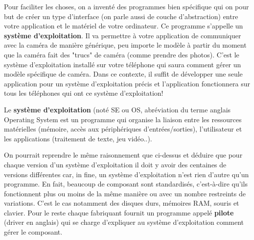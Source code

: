 Pour faciliter les choses, on a inventé des programmes bien spécifique qui on pour but de créer un type d'interface (on parle aussi de couche d'abstraction) entre votre application et le matériel de votre ordinateur. Ce programme s'appelle un {\bf système d’exploitation}. Il va permettre à votre application de communiquer avec la caméra de manière générique, peu importe le modèle à partir du moment que la caméra fait des "trucs" de caméra (comme prendre des photos). C'est le système d'exploitation installé sur votre téléphone qui saura comment gérer un modèle spécifique de caméra. Dans ce contexte, il suffit de développer une seule application pour un système d'exploitation précis et l'application fonctionnera sur tous les téléphones qui ont ce système d'exploitation!
\begin{mydefinition}
	Le {\bf système d’exploitation} (noté SE ou OS, abréviation du terme anglais Operating System est un programme qui organise la liaison entre les ressources matérielles (mémoire, accès aux périphériques d'entrées/sorties), l'utilisateur et les applications (traitement de texte, jeu vidéo..). 
\end{mydefinition}	
On pourrait reprendre le même raisonnement que ci-dessus et déduire que pour chaque version d'un système d'exploitation il doit y avoir des centaines de versions différentes car, in fine, un système d'exploitation n'est rien d'autre qu'un programme. En fait, beaucoup de composant sont standardisés, c'est-à-dire qu'ils fonctionnent plus ou moins de la même manière ou avec un nombre restreints de variations. C'est le cas notamment des disques durs, mémoires RAM, souris et clavier. Pour le reste chaque fabriquant fournit un programme appelé \textbf{pilote} (driver en anglais) qui se charge d'expliquer au système d'exploitation comment gérer le composant. 


